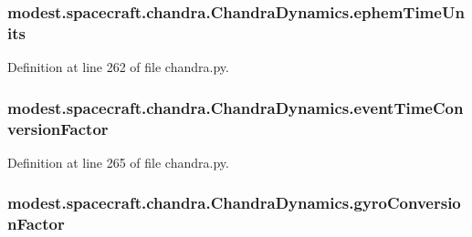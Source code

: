 \subsubsection[{\texorpdfstring{ephem\+Time\+Units}{ephemTimeUnits}}]{\setlength{\rightskip}{0pt plus 5cm}modest.\+spacecraft.\+chandra.\+Chandra\+Dynamics.\+ephem\+Time\+Units}\hypertarget{classmodest_1_1spacecraft_1_1chandra_1_1ChandraDynamics_a2c5ebd1a4d95dada84b299eae59357e8}{}\label{classmodest_1_1spacecraft_1_1chandra_1_1ChandraDynamics_a2c5ebd1a4d95dada84b299eae59357e8}


Definition at line 262 of file chandra.\+py.

\subsubsection[{\texorpdfstring{event\+Time\+Conversion\+Factor}{eventTimeConversionFactor}}]{\setlength{\rightskip}{0pt plus 5cm}modest.\+spacecraft.\+chandra.\+Chandra\+Dynamics.\+event\+Time\+Conversion\+Factor}\hypertarget{classmodest_1_1spacecraft_1_1chandra_1_1ChandraDynamics_af42804586a4bce942c4c55b0ebc57163}{}\label{classmodest_1_1spacecraft_1_1chandra_1_1ChandraDynamics_af42804586a4bce942c4c55b0ebc57163}


Definition at line 265 of file chandra.\+py.

\subsubsection[{\texorpdfstring{gyro\+Conversion\+Factor}{gyroConversionFactor}}]{\setlength{\rightskip}{0pt plus 5cm}modest.\+spacecraft.\+chandra.\+Chandra\+Dynamics.\+gyro\+Conversion\+Factor}\hypertarget{classmodest_1_1spacecraft_1_1chandra_1_1ChandraDynamics_afe69133b89c99c1e82d45abbed9f67ce}{}\label{classmodest_1_1spacecraft_1_1chandra_1_1ChandraDynamics_afe69133b89c99c1e82d45abbed9f67ce}



